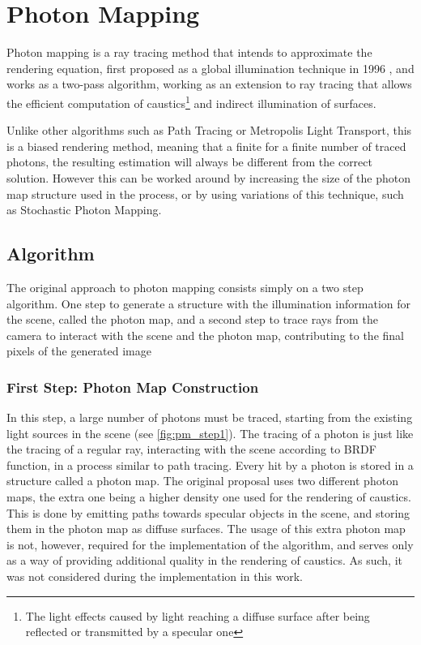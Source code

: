 \documentclass[main.tex]{subfiles}
\begin{document}
\section{Photon Mapping} \label{section:pm}

Photon mapping is a ray tracing method that intends to approximate the rendering equation, first proposed as a global illumination technique in 1996 \cite{jensen1996global}, and works as a two-pass algorithm, working as an extension to ray tracing that allows the efficient computation of caustics\footnote{The light effects caused by light reaching a diffuse surface after being reflected or transmitted by a specular one} and indirect illumination of surfaces.

Unlike other algorithms such as Path Tracing or Metropolis Light Transport, this is a biased rendering method, meaning that a finite for a finite number of traced photons, the resulting estimation will always be different from the correct solution. However this can be worked around by increasing the size of the photon map structure used in the process, or by using variations of this technique, such as Stochastic Photon Mapping.

\subsection{Algorithm}

The original approach to photon mapping consists simply on a two step algorithm. One step to generate a structure with the illumination information for the scene, called the photon map, and a second step to trace rays from the camera to interact with the scene and the photon map, contributing to the final pixels of the generated image


\subsubsection{First Step: Photon Map Construction}

In this step, a large number of photons must be traced, starting from the existing light sources in the scene (see \cref{fig:pm_step1}). The tracing of a photon is just like the tracing of a regular ray, interacting with the scene according to \acs{BRDF} function, in a process similar to path tracing. Every hit by a photon is stored in a structure called a photon map.
The original proposal \cite{jensen1996global} uses two different photon maps, the extra one being a higher density one used for the rendering of caustics. This is done by emitting paths towards specular objects in the scene, and storing them in the photon map as diffuse surfaces.
The usage of this extra photon map is not, however, required for the implementation of the algorithm, and serves only as a way of providing additional quality in the rendering of caustics. As such, it was not considered during the implementation in this work.
\end{document}

